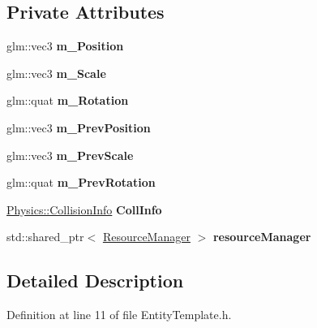 \subsection*{Private Attributes}
\begin{DoxyCompactItemize}
\item 
glm\+::vec3 {\bfseries m\+\_\+\+Position}\hypertarget{class_entity_template_a7d870912d0a3b6b12ea10f961a8dd6ff}{}\label{class_entity_template_a7d870912d0a3b6b12ea10f961a8dd6ff}

\item 
glm\+::vec3 {\bfseries m\+\_\+\+Scale}\hypertarget{class_entity_template_a74618b9555c8ba4026a822fa9ba907e6}{}\label{class_entity_template_a74618b9555c8ba4026a822fa9ba907e6}

\item 
glm\+::quat {\bfseries m\+\_\+\+Rotation}\hypertarget{class_entity_template_ad9095228ca57933e8e44fd09293ee553}{}\label{class_entity_template_ad9095228ca57933e8e44fd09293ee553}

\item 
glm\+::vec3 {\bfseries m\+\_\+\+Prev\+Position}\hypertarget{class_entity_template_a0e5349a4bc69b0b3a751ea0f5ee403fb}{}\label{class_entity_template_a0e5349a4bc69b0b3a751ea0f5ee403fb}

\item 
glm\+::vec3 {\bfseries m\+\_\+\+Prev\+Scale}\hypertarget{class_entity_template_a9900973652555a788884ae19a21f231b}{}\label{class_entity_template_a9900973652555a788884ae19a21f231b}

\item 
glm\+::quat {\bfseries m\+\_\+\+Prev\+Rotation}\hypertarget{class_entity_template_aa075496f781e0966ca16a0a12300bbf9}{}\label{class_entity_template_aa075496f781e0966ca16a0a12300bbf9}

\item 
\hyperlink{class_physics_1_1_collision_info}{Physics\+::\+Collision\+Info} {\bfseries Coll\+Info}\hypertarget{class_entity_template_a954a31be2af5f2c8ffee496443c50442}{}\label{class_entity_template_a954a31be2af5f2c8ffee496443c50442}

\item 
std\+::shared\+\_\+ptr$<$ \hyperlink{class_resource_manager}{Resource\+Manager} $>$ {\bfseries resource\+Manager}\hypertarget{class_entity_template_ab50f8e53879cb19aed028252cca762ac}{}\label{class_entity_template_ab50f8e53879cb19aed028252cca762ac}

\end{DoxyCompactItemize}


\subsection{Detailed Description}


Definition at line 11 of file Entity\+Template.\+h.

